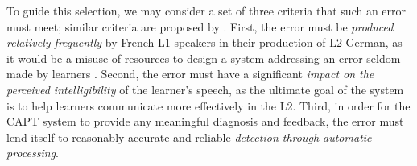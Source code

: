 	To guide this selection, we may consider %
a set of three criteria that such an error must meet; similar criteria are proposed by \textcite{Cucchiarini2009}.
%
First, 
the error must be \textit{produced relatively frequently} by French L1 speakers in their production of L2 German, as it would be a misuse of resources to design a system addressing an error seldom made by learners \citep{Neri2002}.
Second,
the error must have a significant \textit{impact on the perceived intelligibility} of the learner's speech, %
as the ultimate goal of the system is to help learners communicate more effectively in the L2.
Third,
in order for the CAPT system to provide any meaningful diagnosis and feedback, the error must lend itself to reasonably accurate and reliable  \textit{detection through automatic processing}. 
%
%
%
%


